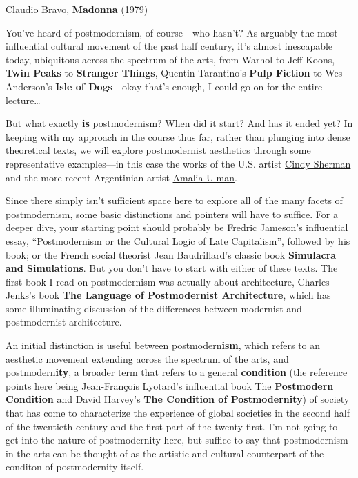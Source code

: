 \documentclass[
  letterpaper,
  DIV=11,
  numbers=noendperiod,
  oneside]{scrartcl}
\begin{document}
\href{https://en.wikipedia.org/wiki/Claudio_Bravo_(painter)}{Claudio
Bravo}, \textbf{Madonna} (1979)

You've heard of postmodernism, of course---who hasn't? As arguably the
most influential cultural movement of the past half century, it's almost
inescapable today, ubiquitous across the spectrum of the arts, from
Warhol to Jeff Koons, \textbf{Twin Peaks} to \textbf{Stranger Things},
Quentin Tarantino's \textbf{Pulp Fiction} to Wes Anderson's \textbf{Isle
of Dogs}---okay that's enough, I could go on for the entire
lecture\ldots{}

But what exactly \textbf{is} postmodernism? When did it start? And has
it ended yet? In keeping with my approach in the course thus far, rather
than plunging into dense theoretical texts, we will explore
postmodernist aesthetics through some representative examples---in this
case the works of the U.S. artist
\href{https://www.artnet.com/artists/cindy-sherman/}{Cindy Sherman} and
the more recent Argentinian artist \href{http://amaliaulman.eu/}{Amalia
Ulman}.

Since there simply isn't sufficient space here to explore all of the
many facets of postmodernism, some basic distinctions and pointers will
have to suffice. For a deeper dive, your starting point should probably
be Fredric Jameson's influential essay, ``Postmodernism or the Cultural
Logic of Late Capitalism'', followed by his book; or the French social
theorist Jean Baudrillard's classic book \textbf{Simulacra and
Simulations}. But you don't have to start with either of these texts.
The first book I read on postmodernism was actually about architecture,
Charles Jenks's book \textbf{The Language of Postmodernist
Architecture}, which has some illuminating discussion of the differences
between modernist and postmodernist architecture.

An initial distinction is useful between postmodern\textbf{ism}, which
refers to an aesthetic movement extending across the spectrum of the
arts, and postmodern\textbf{ity}, a broader term that refers to a
general \textbf{condition} (the reference points here being
Jean-François Lyotard's influential book The \textbf{Postmodern
Condition} and David Harvey's \textbf{The Condition of Postmodernity})
of society that has come to characterize the experience of global
societies in the second half of the twentieth century and the first part
of the twenty-first. I'm not going to get into the nature of
postmodernity here, but suffice to say that postmodernism in the arts
can be thought of as the artistic and cultural counterpart of the
conditon of postmodernity itself.
\end{document}
